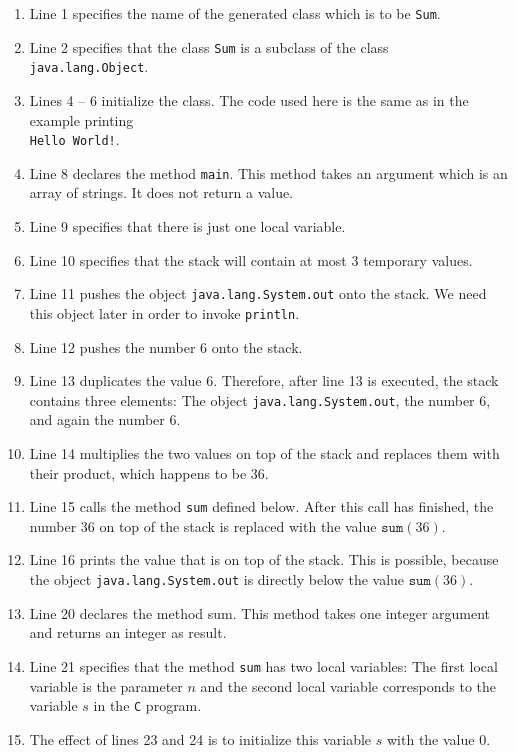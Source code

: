 \begin{enumerate}
\item Line 1 specifies the name of the generated class which is to be \texttt{Sum}.
\item Line 2 specifies that the class \texttt{Sum} is a subclass of the class
      \texttt{java.lang.Object}. 
\item Lines 4 -- 6 initialize the class.  The code used here is the same as in the example printing
      \\[0.2cm]
      \hspace*{1.3cm}
      \texttt{Hello World!}.
\item Line 8 declares the method \texttt{main}.  This method takes an argument which is an array of strings.
      It does not return a value.
\item Line 9 specifies that there is just one local variable.
\item Line 10 specifies that the stack will contain at most 3 temporary values.
\item Line 11 pushes the object \texttt{java.lang.System.out} onto the stack.
      We need this object later in order to invoke \texttt{println}.
\item Line 12 pushes the number 6 onto the stack.
\item Line 13 duplicates the value 6.  Therefore, after line 13 is executed, the stack contains three
      elements: The object \texttt{java.lang.System.out},  the number 6, and again the number 6.
\item Line 14 multiplies the two values on top of the stack and replaces them with their product,
      which happens to be 36.
\item Line 15 calls the method \texttt{sum} defined below.  After this call has finished, the number 
      36 on top of the stack is replaced with the value $\mathtt{sum}(36)$.
\item Line 16 prints the value that is on top of the stack.
      This is possible, because the object \texttt{java.lang.System.out} is directly below the value
      $\texttt{sum}(36)$.
\item Line 20 declares the method sum.  This method takes one integer argument and returns an
      integer as result. 
\item Line 21 specifies that the method \texttt{sum} has two local variables: The first local
      variable is the parameter $n$ and the second local variable corresponds to the variable $s$ in the
      \texttt{C} program.
\item The effect of lines 23 and 24 is to initialize this variable $s$ with the value $0$.

\end{enumerate}
